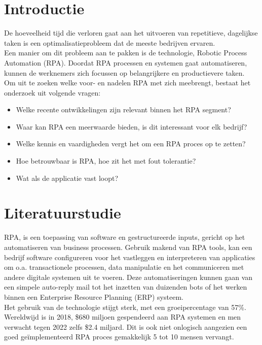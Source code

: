 
\section{Introductie}
\label{sec:introductie}
De hoeveelheid tijd die verloren gaat aan het uitvoeren van repetitieve, dagelijkse taken is een optimalisatieprobleem dat de meeste bedrijven ervaren. \\
Een manier om dit probleem aan te pakken is de technologie, Robotic Process Automation (RPA). Doordat RPA processen en systemen gaat automatiseren, kunnen de werknemers zich focussen op belangrijkere en productievere taken.\\
 Om uit te zoeken welke voor- en nadelen RPA met zich meebrengt, bestaat het onderzoek uit volgende vragen:
\begin{itemize}
	\item Welke recente ontwikkelingen zijn relevant binnen het RPA segment? 
	\item Waar kan RPA een meerwaarde bieden, is dit interessant voor elk bedrijf?
	\item Welke kennis en vaardigheden vergt het om een RPA proces op te zetten?
	\item Hoe betrouwbaar is RPA, hoe zit het met fout tolerantie?
	\item Wat als de applicatie vast loopt?
\end{itemize}


\section{Literatuurstudie}
\label{sec:literatuurstudie}
RPA, is een toepassing van software en gestructureerde inputs, gericht op het automatiseren van business processen. Gebruik makend van RPA tools, kan een bedrijf software configureren voor het vastleggen en interpreteren van applicaties om o.a. transactionele processen, data manipulatie en het communiceren met andere digitale systemen uit te voeren. Deze automatiseringen kunnen gaan van een simpele auto-reply mail tot het inzetten van duizenden bots of het werken binnen een Enterprise Resource Planning (ERP) systeem. \autocite{whatIsRPA} \\
Het gebruik van de technologie stijgt sterk, met een groeipercentage van 57\%. Wereldwijd is in 2018, \$680 miljoen gespendeerd aan RPA systemen en men verwacht tegen 2022 zelfs  \$2.4 miljard.  \autocite{isRPAWorthIt}  Dit is ook niet onlogisch aangezien een goed geïmplementeerd RPA proces gemakkelijk 5 tot 10 mensen vervangt. \autocite{rpaMomentum}

